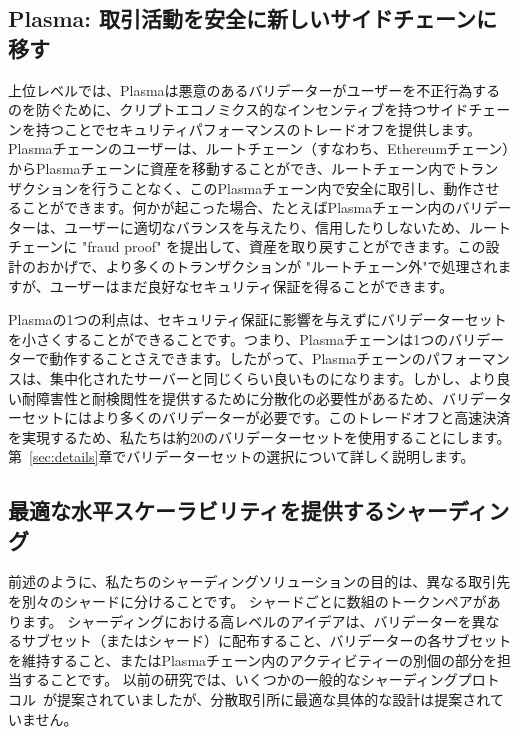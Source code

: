 \subsection{Plasma: 取引活動を安全に新しいサイドチェーンに移す}

上位レベルでは、Plasmaは悪意のあるバリデーターがユーザーを不正行為するのを防ぐために、クリプトエコノミクス的なインセンティブを持つサイドチェーンを持つことでセキュリティパフォーマンスのトレードオフを提供します。 Plasmaチェーンのユーザーは、ルートチェーン（すなわち、Ethereumチェーン）からPlasmaチェーンに資産を移動することができ、ルートチェーン内でトランザクションを行うことなく、このPlasmaチェーン内で安全に取引し、動作させることができます。何かが起こった場合、たとえばPlasmaチェーン内のバリデーターは、ユーザーに適切なバランスを与えたり、信用したりしないため、ルートチェーンに "fraud proof" を提出して、資産を取り戻すことができます。この設計のおかげで、より多くのトランザクションが "ルートチェーン外"で処理されますが、ユーザーはまだ良好なセキュリティ保証を得ることができます。

Plasmaの1つの利点は、セキュリティ保証に影響を与えずにバリデーターセットを小さくすることができることです。つまり、Plasmaチェーンは1つのバリデーターで動作することさえできます。したがって、Plasmaチェーンのパフォーマンスは、集中化されたサーバーと同じくらい良いものになります。しかし、より良い耐障害性と耐検閲性を提供するために分散化の必要性があるため、バリデーターセットにはより多くのバリデーターが必要です。このトレードオフと高速決済を実現するため、私たちは約20のバリデーターセットを使用することにします。第~\ref{sec:details}章でバリデーターセットの選択について詳しく説明します。

\subsection{最適な水平スケーラビリティを提供するシャーディング}

前述のように、私たちのシャーディングソリューションの目的は、異なる取引先を別々のシャードに分けることです。 シャードごとに数組のトークンペアがあります。 シャーディングにおける高レベルのアイデアは、バリデーターを異なるサブセット（またはシャード）に配布すること、バリデーターの各サブセットを維持すること、またはPlasmaチェーン内のアクティビティーの別個の部分を担当することです。 以前の研究では、いくつかの一般的なシャーディングプロトコル~\cite{elastico, omniledger, zilliqa}が提案されていましたが、分散取引所に最適な具体的な設計は提案されていません。

